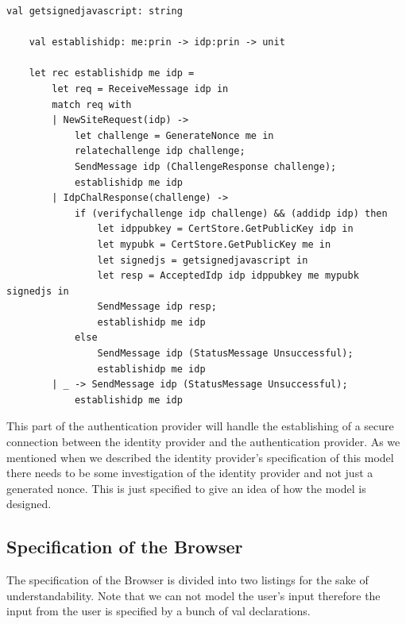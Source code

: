 \documentclass[twosided]{report}
\begin{document}
\begin{lstlisting}[style=fstar, caption={Establishing a secure connection with the Identity Provider}]
	val getsignedjavascript: string

	val establishidp: me:prin -> idp:prin -> unit

	let rec establishidp me idp =
		let req = ReceiveMessage idp in
		match req with
		| NewSiteRequest(idp) ->
			let challenge = GenerateNonce me in
			relatechallenge idp challenge;
			SendMessage idp (ChallengeResponse challenge);
			establishidp me idp
		| IdpChalResponse(challenge) ->
			if (verifychallenge idp challenge) && (addidp idp) then
				let idppubkey = CertStore.GetPublicKey idp in
				let mypubk = CertStore.GetPublicKey me in
				let signedjs = getsignedjavascript in
				let resp = AcceptedIdp idp idppubkey me mypubk signedjs in
				SendMessage idp resp;
				establishidp me idp
			else
				SendMessage idp (StatusMessage Unsuccessful);
				establishidp me idp
		| _ -> SendMessage idp (StatusMessage Unsuccessful);
			establishidp me idp
\end{lstlisting}

This part of the authentication provider will handle the establishing of a secure connection between the identity provider and the authentication provider. As we mentioned when we described the identity provider's specification of this model there needs to be some investigation of the identity provider and not just a generated nonce. This is just specified to give an idea of how the model is designed.

\subsection{Specification of the Browser}
The specification of the Browser is divided into two listings for the sake of understandability. Note that we can not model the user's input therefore the input from the user is specified by a bunch of val declarations.
\end{document}
